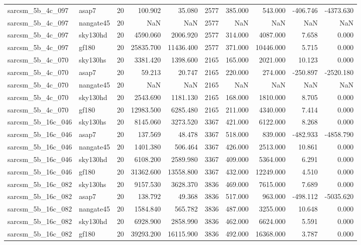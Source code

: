 \begin{tabular}{llrrrrrrrr}
sarcsm\_5b\_4c\_097 & asap7 & 20 & 100.902 & 35.080 & 2577 & 385.000 & 543.000 & -406.746 & -4373.630 \\
sarcsm\_5b\_4c\_097 & nangate45 & 20 & NaN & NaN & 2577 & NaN & NaN & NaN & NaN \\
sarcsm\_5b\_4c\_097 & sky130hd & 20 & 4590.060 & 2006.920 & 2577 & 314.000 & 4087.000 & 7.658 & 0.000 \\
sarcsm\_5b\_4c\_097 & gf180 & 20 & 25835.700 & 11436.400 & 2577 & 371.000 & 10446.000 & 5.715 & 0.000 \\
sarcsm\_5b\_4c\_070 & sky130hs & 20 & 3381.420 & 1398.600 & 2165 & 165.000 & 2021.000 & 10.123 & 0.000 \\
sarcsm\_5b\_4c\_070 & asap7 & 20 & 59.213 & 20.747 & 2165 & 220.000 & 274.000 & -250.897 & -2520.180 \\
sarcsm\_5b\_4c\_070 & nangate45 & 20 & NaN & NaN & 2165 & NaN & NaN & NaN & NaN \\
sarcsm\_5b\_4c\_070 & sky130hd & 20 & 2543.690 & 1181.130 & 2165 & 168.000 & 1810.000 & 8.705 & 0.000 \\
sarcsm\_5b\_4c\_070 & gf180 & 20 & 12983.500 & 6285.480 & 2165 & 211.000 & 4340.000 & 7.414 & 0.000 \\
sarcsm\_5b\_16c\_046 & sky130hs & 20 & 8145.060 & 3273.520 & 3367 & 421.000 & 6122.000 & 8.268 & 0.000 \\
sarcsm\_5b\_16c\_046 & asap7 & 20 & 137.569 & 48.478 & 3367 & 518.000 & 839.000 & -482.933 & -4858.790 \\
sarcsm\_5b\_16c\_046 & nangate45 & 20 & 1401.380 & 506.464 & 3367 & 426.000 & 2513.000 & 10.861 & 0.000 \\
sarcsm\_5b\_16c\_046 & sky130hd & 20 & 6108.200 & 2589.980 & 3367 & 409.000 & 5364.000 & 6.291 & 0.000 \\
sarcsm\_5b\_16c\_046 & gf180 & 20 & 31362.600 & 13558.800 & 3367 & 432.000 & 12249.000 & 4.510 & 0.000 \\
sarcsm\_5b\_16c\_082 & sky130hs & 20 & 9157.530 & 3628.370 & 3836 & 469.000 & 7615.000 & 7.689 & 0.000 \\
sarcsm\_5b\_16c\_082 & asap7 & 20 & 138.792 & 49.368 & 3836 & 517.000 & 963.000 & -498.112 & -5035.620 \\
sarcsm\_5b\_16c\_082 & nangate45 & 20 & 1584.840 & 565.782 & 3836 & 487.000 & 3255.000 & 10.648 & 0.000 \\
sarcsm\_5b\_16c\_082 & sky130hd & 20 & 6928.900 & 2858.990 & 3836 & 462.000 & 6624.000 & 5.591 & 0.000 \\
sarcsm\_5b\_16c\_082 & gf180 & 20 & 39293.200 & 16115.900 & 3836 & 492.000 & 16368.000 & 3.787 & 0.000 \\

\end{tabular}
